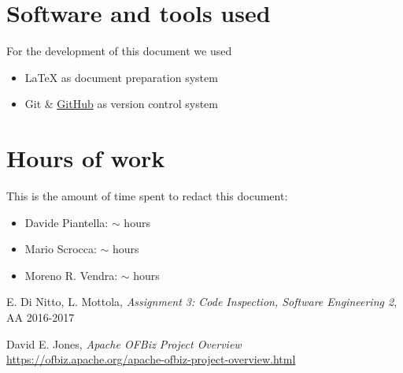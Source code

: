 \begin{appendices}

	\section{Software and tools used}
	For the development of this document we used
	\begin{itemize}
		\item \LaTeX{} as document preparation system 
		\item Git \& \href{http://github.com}{GitHub} as version control system 
	\end{itemize}
	
	\section{Hours of work}
	This is the amount of time spent to redact this document:
	\begin{itemize}
		\item Davide Piantella: $\sim$ hours
		\item Mario Scrocca: $\sim$ hours
		\item Moreno R. Vendra: $\sim$ hours
	\end{itemize}
	
\end{appendices}


\begin{thebibliography}{9}

 E. Di Nitto, L. Mottola, \emph{Assignment 3: Code Inspection, Software Engineering 2}, AA 2016-2017

 David E. Jones, \emph{Apache OFBiz Project Overview}\\
\url{https://ofbiz.apache.org/apache-ofbiz-project-overview.html}

\end{thebibliography}
